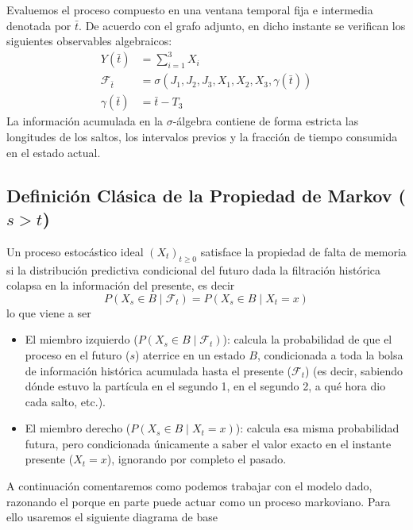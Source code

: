 \hfill
\begin{minipage}{0.45\textwidth}
    Evaluemos el proceso compuesto en una ventana temporal fija e intermedia denotada por $\bar{t}$. De acuerdo con el grafo adjunto, en dicho instante se verifican los siguientes observables algebraicos:
    \begin{align*}
        Y(\bar{t}) &= \sum_{i=1}^{3} X_i \\[0.1cm]
        \mathcal{F}_{\bar{t}} &= \sigma\left(J_1, J_2, J_3, X_1, X_2, X_3, \gamma(\bar{t})\right) \\[0.1cm]
        \gamma(\bar{t}) &= \bar{t} - T_3
    \end{align*}
    La información acumulada en la $\sigma$-álgebra contiene de forma estricta las longitudes de los saltos, los intervalos previos y la fracción de tiempo consumida en el estado actual.
\end{minipage}

\subsection{Definición Clásica de la Propiedad de Markov ($s > t$)}
\noindent
Un proceso estocástico ideal $(X_t)_{t \ge 0}$ satisface la propiedad de falta de memoria si la distribución predictiva condicional del futuro dada la filtración histórica colapsa en la información del presente, es decir
\[
P(X_s \in B \mid \mathcal{F}_t) = P(X_s \in B \mid X_t = x)
\]
lo que viene a ser 
\begin{itemize}
    \item El miembro izquierdo ($P(X_s \in B \mid \mathcal{F}_t)$): calcula la probabilidad de que el proceso en el futuro ($s$) aterrice en un estado $B$, condicionada a toda la bolsa de información histórica acumulada hasta el presente ($\mathcal{F}_t$) (es decir, sabiendo dónde estuvo la partícula en el segundo 1, en el segundo 2, a qué hora dio cada salto, etc.).

    \item El miembro derecho ($P(X_s \in B \mid X_t = x)$): calcula esa misma probabilidad futura, pero condicionada únicamente a saber el valor exacto en el instante presente ($X_t = x$), ignorando por completo el pasado. \\
\end{itemize} 

\noindent
A continuación comentaremos como podemos trabajar con el modelo dado, razonando el porque en parte puede actuar como un proceso markoviano. Para ello usaremos el siguiente diagrama de base

